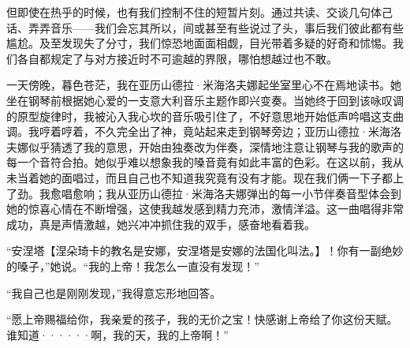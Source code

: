 \documentclass[12pt, UTF8]{ctexbook}
\begin{document}
\par 但即使在热乎的时候，也有我们控制不住的短暂片刻。通过共读、交谈几句体己话、弄弄音乐——我们会忘其所以，间或甚至有些说过了头，事后我们彼此都有些尴尬。及至发现失了分寸，我们惊恐地面面相觑，目光带着多疑的好奇和怵惕。我们各自都规定了与对方接近时不可逾越的界限，哪怕想越过也不敢。
\par 一天傍晚，暮色苍茫，我在亚历山德拉·米海洛夫娜起坐室里心不在焉地读书。她坐在钢琴前根据她心爱的一支意大利音乐主题作即兴变奏。当她终于回到该咏叹调的原型旋律时，我被沁入我心坎的音乐吸引住了，不好意思地开始低声吟唱这支曲调。我哼着哼着，不久完全出了神，竟站起来走到钢琴旁边；亚历山德拉·米海洛夫娜似乎猜透了我的意思，开始由独奏改为伴奏，深情地注意让钢琴与我的歌声的每一个音符合拍。她似乎难以想象我的嗓音竟有如此丰富的色彩。在这以前，我从未当着她的面唱过，而且自己也不知道我究竟有没有才能。现在我们俩一下子都上了劲。我愈唱愈响；我从亚历山德拉·米海洛夫娜弹出的每一小节伴奏音型体会到她的惊喜心情在不断增强，这使我越发感到精力充沛，激情洋溢。这一曲唱得非常成功，真是声情激越，她兴冲冲抓住我的双手，感奋地看着我。
\par “安涅塔【涅朵琦卡的教名是安娜，安涅塔是安娜的法国化叫法。】！你有一副绝妙的嗓子，”她说。“我的上帝！我怎么一直没有发现！”
\par “我自己也是刚刚发现，”我得意忘形地回答。
\par “愿上帝赐福给你，我亲爱的孩子，我的无价之宝！快感谢上帝给了你这份天赋。谁知道······啊，我的天，我的上帝啊！”
\end{document}
